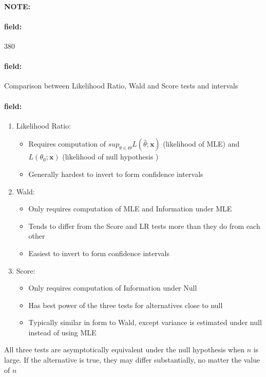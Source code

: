 \documentclass[12pt]{article}
\newenvironment{note}{\paragraph{NOTE:}}{}
\newenvironment{field}{\paragraph{field:}}{}
\begin{document}
\begin{note}
    \begin{field}
        \tiny 380
    \end{field}
    \begin{field}
        Comparison between Likelihood Ratio, Wald and Score tests and intervals
    \end{field}
    \begin{field}
        \begin{enumerate}
          \item Likelihood Ratio:
          \begin{itemize}
            \item Requires computation of $sup_{\theta \in \Theta} L(\hat{\theta};\mathbf{x})$ (likelihood of MLE) and $L(\theta_0; \mathbf{x})$ (likelihood of null hypothesis )
            \item Generally hardest to invert to form confidence intervals
          \end{itemize}
          \item Wald:
          \begin{itemize}
            \item Only requires computation of MLE and Information under MLE
            \item Tends to differ from the Score and LR tests more than they do from each other
            \item Easiest to invert to form confidence intervals
          \end{itemize}
          \item Score:
          \begin{itemize}
            \item Only requires computation of Information under Null
            \item Has best power of the three tests for alternatives close to null
            \item Typically similar in form to Wald, except variance is estimated under null instead of using MLE
          \end{itemize}
        \end{enumerate}
        All three tests are asymptotically equivalent under the null hypothesis when $n$ is large. If the alternative is true, they may differ substantially, no matter the value of $n$
    \end{field}
\end{note}
\end{document}
